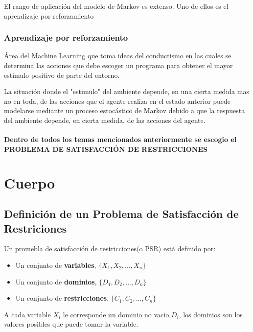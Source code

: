 \documentclass[a4paper]{article}
\begin{document}
El rango de aplicación del modelo de Markov es extenso. Uno de ellos es el aprendizaje por reforzamiento

\subsubsection*{Aprendizaje por reforzamiento}
Área del Machine Learning que toma ideas del conductismo en las cuales se determina las acciones que debe escoger un programa para obtener el mayor estimulo positivo de parte del entorno.

La situación donde el "estimulo" del ambiente depende, en una cierta medida mas no en toda, de las acciones que el agente realiza en el estado anterior puede modelarse mediante un proceso estocástico de Markov debido a que la respuesta del ambiente depende, en cierta medida, de las acciones del agente.\\\\

\textbf{
Dentro de todos los temas mencionados anteriormente se escogio el PROBLEMA DE SATISFACCIÓN DE RESTRICCIONES}
% 



\pagebreak
\section{Cuerpo}
\subsection{Definición de un  Problema de Satisfacción de Restriciones}
Un promebla de satisfacción de restricciones(o PSR) está definido por:
\begin{itemize}
	\item Un conjunto de \textbf{variables}, $\{X_1, X_2,..., X_n\}$
	\item Un conjunto de \textbf{dominios}, $\{D_1, D_2,..., D_n\}$
	\item Un conjunto de \textbf{restricciones}, $\{C_1, C_2,..., C_n\}$
\end{itemize} 
A cada variable $X_i$ le corresponde un dominio no vacio $D_i$, los dominios son los valores posibles que puede tomar la variable. 
\end{document}
